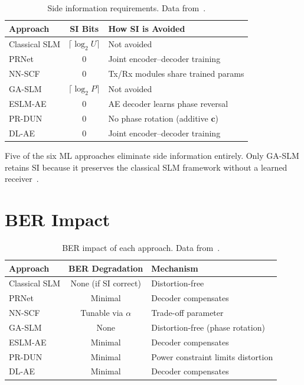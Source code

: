 \begin{table}[H]
    \centering
    \caption{Side information requirements.
             Data from~\cite{kim2017novel,zou2021novel,ali2016new,hao2019extended,nguyen2022deep,alnaseri2025deep}.}
    \label{tab:si_comparison}
    \begin{tabular}{@{} l c l @{}}
        \toprule
        \textbf{Approach} & \textbf{SI Bits} & \textbf{How SI is Avoided} \\
        \midrule
        Classical SLM & $\lceil\log_2 U\rceil$ & Not avoided \\
        PRNet & 0 & Joint encoder--decoder training \\
        NN-SCF & 0 & Tx/Rx modules share trained params \\
        GA-SLM & $\lceil\log_2 P\rceil$ & Not avoided \\
        ESLM-AE & 0 & AE decoder learns phase reversal \\
        PR-DUN & 0 & No phase rotation (additive $\bm{c}$) \\
        DL-AE & 0 & Joint encoder--decoder training \\
        \bottomrule
    \end{tabular}
\end{table}

Five of the six ML approaches eliminate side information entirely.
Only GA-SLM retains SI because it preserves the classical SLM framework
without a learned receiver~\cite{ali2016new}.


\section{BER Impact}
\label{sec:comparison_ber}

\begin{table}[H]
    \centering
    \caption{BER impact of each approach.
             Data from~\cite{kim2017novel,zou2021novel,ali2016new,hao2019extended,nguyen2022deep,alnaseri2025deep}.}
    \label{tab:ber_comparison}
    \begin{tabular}{@{} l c l @{}}
        \toprule
        \textbf{Approach} & \textbf{BER Degradation} & \textbf{Mechanism} \\
        \midrule
        Classical SLM & None (if SI correct) & Distortion-free \\
        PRNet & Minimal & Decoder compensates \\
        NN-SCF & Tunable via $\alpha$ & Trade-off parameter \\
        GA-SLM & None & Distortion-free (phase rotation) \\
        ESLM-AE & Minimal & Decoder compensates \\
        PR-DUN & Minimal & Power constraint limits distortion \\
        DL-AE & Minimal & Decoder compensates \\
        \bottomrule
    \end{tabular}
\end{table}


